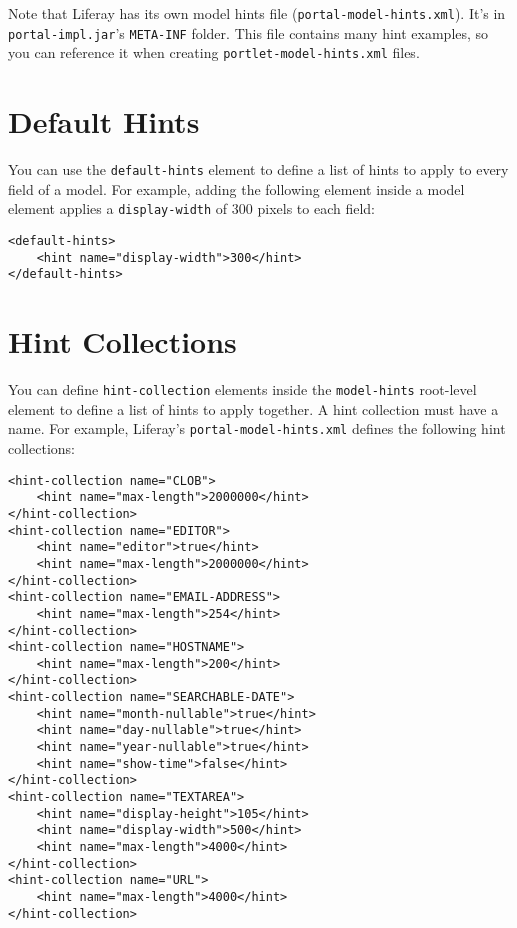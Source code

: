 \noindent\hrulefill

Note that Liferay has its own model hints file
(\texttt{portal-model-hints.xml}). It's in \texttt{portal-impl.jar}'s
\texttt{META-INF} folder. This file contains many hint examples, so you
can reference it when creating \texttt{portlet-model-hints.xml} files.

\section{Default Hints}\label{default-hints}

You can use the \texttt{default-hints} element to define a list of hints
to apply to every field of a model. For example, adding the following
element inside a model element applies a \texttt{display-width} of 300
pixels to each field:

\begin{verbatim}
<default-hints>
    <hint name="display-width">300</hint>
</default-hints>
\end{verbatim}

\section{Hint Collections}\label{hint-collections}

You can define \texttt{hint-collection} elements inside the
\texttt{model-hints} root-level element to define a list of hints to
apply together. A hint collection must have a name. For example,
Liferay's \texttt{portal-model-hints.xml} defines the following hint
collections:

\begin{verbatim}
<hint-collection name="CLOB">
    <hint name="max-length">2000000</hint>
</hint-collection>
<hint-collection name="EDITOR">
    <hint name="editor">true</hint>
    <hint name="max-length">2000000</hint>
</hint-collection>
<hint-collection name="EMAIL-ADDRESS">
    <hint name="max-length">254</hint>
</hint-collection>
<hint-collection name="HOSTNAME">
    <hint name="max-length">200</hint>
</hint-collection>
<hint-collection name="SEARCHABLE-DATE">
    <hint name="month-nullable">true</hint>
    <hint name="day-nullable">true</hint>
    <hint name="year-nullable">true</hint>
    <hint name="show-time">false</hint>
</hint-collection>
<hint-collection name="TEXTAREA">
    <hint name="display-height">105</hint>
    <hint name="display-width">500</hint>
    <hint name="max-length">4000</hint>
</hint-collection>
<hint-collection name="URL">
    <hint name="max-length">4000</hint>
</hint-collection>
\end{verbatim}

